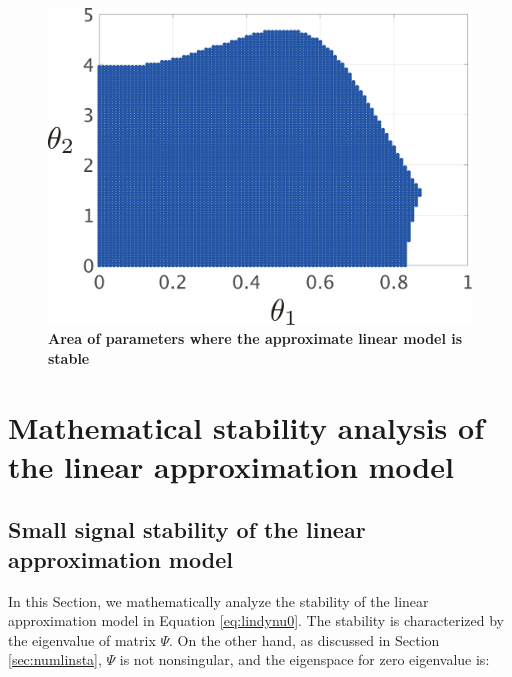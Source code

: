 \documentclass[graybox, envcountchap]{svmult}
\begin{document}
\begin{figure}[t!]
{\begin{minipage}{0.49\linewidth}
    \medskip
  \end{minipage}
  \begin{minipage}{0.49\linewidth}
    \centering
    \includegraphics[width = 0.90\linewidth]{figs/Y0.01D0.01}
    \medskip
  \end{minipage}
}
 \caption{\textbf{Area of parameters where the approximate linear model is stable}}
 \label{fig:stacheck}
\medskip
\end{figure}


\section{Mathematical stability analysis of the linear approximation model\advanced}\label{sec:linmathana}

\subsection{Small signal stability of the linear approximation model\advanced}
In this Section, we mathematically analyze the stability of the linear approximation model in Equation \ref{eq:lindynu0}.
The stability is characterized by the eigenvalue of matrix $\Psi$.
On the other hand, as discussed in Section \ref{sec:numlinsta}, $\Psi$ is not nonsingular, and the eigenspace for zero eigenvalue is:
\end{document}
